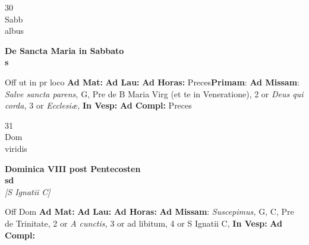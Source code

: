 \documentclass[10pt, openany]{book}
\begin{document}
        \begin{center}
            \begin{minipage}{3.5in}
                \vspace{2em}
                \begin{minipage}{0.5in}
                    {\Huge 30} \\
                    {\normalsize Sabb} \\
                    {\normalsize albus}
                \end{minipage}
                \begin{minipage}{3.0in}
                    \textbf{ \large De Sancta Maria in Sabbato \\
                    \textnormal{\normalsize s}} \\ 
                \end{minipage}
                \begin{justify}Off ut in pr loco
                    \textbf{Ad Mat: }
                    \textbf{Ad Lau: }
                    \textbf{Ad Horas: }Preces\textbf{Primam}: \textbf{Ad Missam}: \textit{Salve sancta parens,} G, Pre de B Maria Virg (et te in Veneratione), 2 or \textit{Deus qui corda,} 3 or \textit{Ecclesiæ,}  
                    \textbf{In Vesp: }
                    \textbf{Ad Compl: }Preces
                \end{justify}
            \end{minipage}
        \end{center}
    
        \begin{center}
            \begin{minipage}{3.5in}
                \vspace{2em}
                \begin{minipage}{0.5in}
                    {\Huge 31} \\
                    {\normalsize Dom} \\
                    {\normalsize viridis}
                \end{minipage}
                \begin{minipage}{3.0in}
                    \textbf{ \large Dominica VIII post Pentecosten \\
                    \textnormal{\normalsize sd}} \\ \textit{[S Ignatii C]} \\ 
                \end{minipage}
                \begin{justify}Off Dom
                    \textbf{Ad Mat: }
                    \textbf{Ad Lau: }
                    \textbf{Ad Horas: }\textbf{Ad Missam}: \textit{Suscepimus,} G, C, Pre de Trinitate, 2 or \textit{A cunctis,} 3 or ad libitum, 4 or S Ignatii C,  
                    \textbf{In Vesp: }
                    \textbf{Ad Compl: }
                \end{justify}
            \end{minipage}
        \end{center}
    
\end{document}
